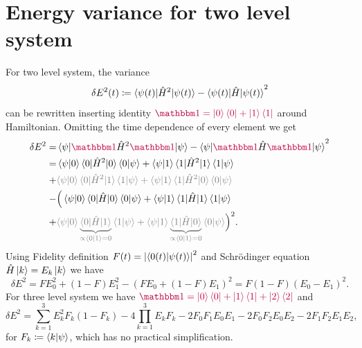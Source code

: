 \section{Energy variance for two level system}
For two level system, the variance
\begin{equation}
    \delta E^2(t)\coloneqq \braket{\psi(t)|\hat{H}^2|\psi(t)}-\braket{\psi(t)|\hat{H}|\psi(t)}^2
\end{equation}
can be rewritten inserting identity $\textcolor{purple}{\Id=\ket{0}\bra{0}+\ket{1}\bra{1}}$ around Hamiltonian. Omitting the time dependence of every element we get
\begin{equation}
    \begin{split}
        \delta E^2 =& \braket{\psi|\textcolor{purple}{\Id}\HH^2\textcolor{purple}{\Id}|\psi}-\braket{\psi|\textcolor{purple}{\Id}\HH\textcolor{purple}{\Id}|\psi}^2\\
        =&\braket{\psi|0}\braket{0|\HH^2|0}\braket{0|\psi}+\braket{\psi|1}\braket{1|\HH^2|1}\braket{1|\psi}\\
        +&\textcolor{gray}{\braket{\psi|0}\braket{0|\HH^2|1}\braket{1|\psi}+\braket{\psi|1}\braket{1|\HH^2|0}\braket{0|\psi}}\\
        -&\Big(\braket{\psi|0}\braket{0|\HH|0}\braket{0|\psi}+\braket{\psi|1}\braket{1|\HH|1}\braket{1|\psi}\\
        +&\textcolor{gray}{\braket{\psi|0}\underbrace{\braket{0|\HH|1}}_{\propto \braket{0|1}=0}\braket{1|\psi}+\braket{\psi|1}\underbrace{\braket{1|\HH|0}}_{\propto \braket{0|1}=0}\braket{0|\psi}}\Big)^2.
    \end{split}
\end{equation}
Using Fidelity definition $F(t)=\left|\braket{0(t)|\psi(t)}\right|^2$ and Schr\"odinger equation $\hat{H}\ket{k}=E_k\ket{k}$ we have
\begin{equation}
    \delta E^2 = FE_0^2+(1-F)E_1^2 - (FE_0+(1-F)E_1)^2 = F(1-F)(E_0-E_1)^2.
\end{equation}
For three level system we have $\textcolor{purple}{\Id=\ket{0}\bra{0}+\ket{1}\bra{1}+\ket{2}\bra{2}}$ and
\begin{equation}
    \delta E^2=\sum_{k=1}^3 E_k^2 F_k(1-F_k)-4\prod_{k=1}^3 E_kF_k-2F_0F_1E_0E_1-2F_0F_2E_0E_2-2F_1F_2E_1E_2,
\end{equation}
for $F_k\coloneqq \braket{k|\psi}$, which has no practical simplification.
